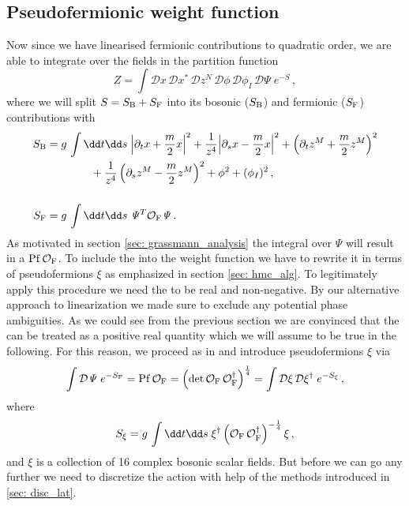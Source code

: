 %
%
%
%
%
%
%
%
%
%
\subsection{Pseudofermionic weight function}
Now since we have linearised fermionic contributions to quadratic order, we are able to integrate over the  fields in the partition function
%
%
\begin{equation}
Z = \int \mathcal{D}x\,\mathcal{D}x^{*}\,\mathcal{D}z^{N}\,\mathcal{D}\phi\,\mathcal{D}\phi_{I}\,\mathcal{D}\mathit{\Psi}\; e^{-S}\,,
\end{equation}
%
%
where we will split $S = S_{\rm B} + S_{\rm F}$ into its bosonic ($S_{\rm B}$) and fermionic ($S_{\rm F}$) contributions with
%
%
\begin{align}
S_{\rm B} &= g\,\int \dd t\dd s\; {\left\vert \partial_t {x} + {\frac{m}{2}}{x} \right\vert}^2 + \frac{1}{{ z}^4}{\left\vert \partial_s {x} -\frac{m}{2}{x} \right\vert}^2 + \left(\partial_t {z}^M + \frac{m}{2}{z}^M \right)^2 \notag \\
&\qquad\qquad+ \frac{1}{{ z}^4} \left(\partial_s {z}^M -\frac{m}{2}{z}^M\right)^2 + \phi^2 + (\phi_{I})^{2}\,, \label{eq: bos_act} \\[0.5cm]
S_{\rm F} &=  g\,\int \dd t\dd s\; \mathit{\Psi}^T \mathcal{O}_{\rm F} \mathit{\Psi}\,. \notag
\end{align}
%
%
As motivated in section \ref{sec: grassmann_analysis} the  integral over $\mathit{\Psi}$ will result in a  ${\rm Pf}\,\mathcal{O}_{\rm F}$. To include the  into the weight function we have to rewrite it in terms of pseudofermions $\xi$ as emphasized in section \ref{sec: hmc_alg}. To legitimately apply this procedure we need the  to be real and non-negative. By our alternative approach to linearization we made sure to exclude any potential phase ambiguities. As we could see from the previous section we are convinced that the  can be treated as a positive real quantity which we will assume to be true in the following. For this reason, we proceed as in \cite{Roiban} and introduce pseudofermions $\xi$ via
%
%
\begin{equation}
\int \mathcal{D}\mathit{\Psi}\; e^{-S_{\rm F}} = {\rm Pf}\,\mathcal{O}_{\rm F} =\left( \det \mathcal{O}_{\rm F}\,\mathcal{O}_{\rm F}^{\dagger} \right)^{\frac{1}{4}} = \int \mathcal{D}\xi\,\mathcal{D}\xi^{\dagger}\; e^{-S_{\xi}}\,,
\end{equation}
%
%
where
%
%
\begin{equation}
S_{\xi} = g\,\int \dd t\dd s \; \xi^{\dagger} \left(\mathcal{O}_{\rm F}\,\mathcal{O}_{\rm F}^{\dagger} \right)^{-\frac{1}{4}} \xi \,,
\end{equation}
and $\xi$ is a collection of 16 complex bosonic scalar fields. But before we can go any further we need to discretize the action with help of the methods introduced in \autoref{sec: disc_lat}.
%
%
%
%
%
%
%
%
%
%
